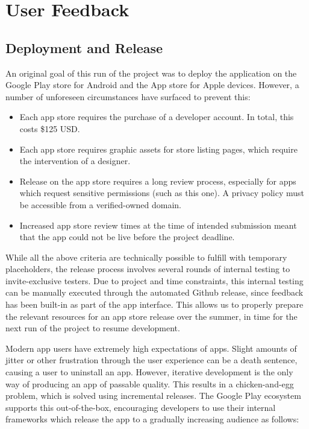 \section{User Feedback}
\subsection{Deployment and Release}
An original goal of this run of the project was to deploy the application on the Google Play store for Android and the App store for Apple devices. However, a number of unforeseen circumstances have surfaced to prevent this:

\begin{itemize}
	\item Each app store requires the purchase of a developer account. In total, this costs \$125 USD.
	\item Each app store requires graphic assets for store listing pages, which require the intervention of a designer.
	\item Release on the app store requires a long review process, especially for apps which request sensitive permissions (such as this one). A privacy policy must be accessible from a verified-owned domain.
	\item Increased app store review times at the time of intended submission meant that the app could not be live before the project deadline.
\end{itemize}

While all the above criteria are technically possible to fulfill with temporary placeholders, the release process involves several rounds of internal testing to invite-exclusive testers. Due to project and time constraints, this internal testing can be manually executed through the automated Github release, since feedback has been built-in as part of the app interface. This allows us to properly prepare the relevant resources for an app store release over the summer, in time for the next run of the project to resume development.

Modern app users have extremely high expectations of apps. Slight amounts of jitter or other frustration through the user experience can be a death sentence, causing a user to uninstall an app. However, iterative development is the only way of producing an app of passable quality. This results in a chicken-and-egg problem, which is solved using incremental releases. The Google Play ecosystem supports this out-of-the-box, encouraging developers to use their internal frameworks which release the app to a gradually increasing audience as follows:

